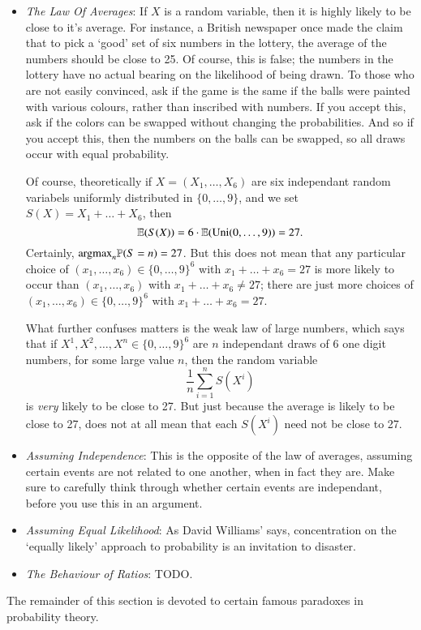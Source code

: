 \begin{itemize}
    \item \emph{The Law Of Averages}: If $X$ is a random variable, then it is highly likely to be close to it's average. For instance, a British newspaper once made the claim that to pick a `good' set of six numbers in the lottery, the average of the numbers should be close to 25. Of course, this is false; the numbers in the lottery have no actual bearing on the likelihood of being drawn. To those who are not easily convinced, ask if the game is the same if the balls were painted with various colours, rather than inscribed with numbers. If you accept this, ask if the colors can be swapped without changing the probabilities. And so if you accept this, then the numbers on the balls can be swapped, so all draws occur with equal probability.

    Of course, theoretically if $X = (X_1, \dots, X_6)$ are six independant random variabels uniformly distributed in $\{ 0, \dots, 9 \}$, and we set $S(X) = X_1 + \dots + X_6$, then
    \[ \operatorname{\mathbb{E}}(S(X)) = 6 \cdot \operatorname{\mathbb{E}}(\text{Uni}(0,\dots,9)) = 27. \]
    Certainly, $\text{argmax}_n \mathbb{P}(S = n) = 27$. But this does not mean that any particular choice of $(x_1, \dots, x_6) \in \{ 0, \dots, 9 \}^6$ with $x_1 + \dots + x_6 = 27$ is more likely to occur than $(x_1, \dots, x_6)$ with $x_1 + \dots + x_6 \neq 27$; there are just more choices of $(x_1, \dots, x_6) \in \{ 0, \dots, 9 \}^6$ with $x_1 + \dots + x_6 = 27$.

    What further confuses matters is the weak law of large numbers, which says that if $X^1, X^2, \dots, X^n \in \{ 0, \dots, 9 \}^6$ are $n$ independant draws of 6 one digit numbers, for some large value $n$, then the random variable
    \[ \frac{1}{n} \sum_{i = 1}^n S(X^i) \]
    is \emph{very} likely to be close to 27. But just because the average is likely to be close to 27, does not at all mean that each $S(X^i)$ need not be close to 27.

    \item \emph{Assuming Independence}: This is the opposite of the law of averages, assuming certain events are not related to one another, when in fact they are. Make sure to carefully think through whether certain events are independant, before you use this in an argument.

    \item \emph{Assuming Equal Likelihood}: As David Williams' says, concentration on the `equally likely' approach to probability is an invitation to disaster.

    \item \emph{The Behaviour of Ratios}: TODO.
\end{itemize}
%
The remainder of this section is devoted to certain famous paradoxes in probability theory.

